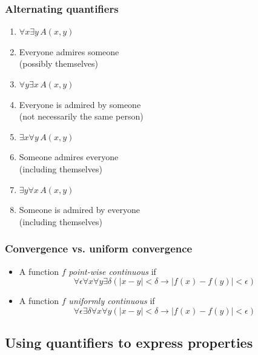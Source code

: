 \begin{frame}
    \frametitle{Alternating quantifiers}

\begin{enumerate}[<+->]
  \item $\forall x \exists y \, A(x, y)$
  \item<2->[] Everyone admires someone\\
    (possibly themselves)
  \item $\forall y \exists x \, A(x, y)$
  \item<3->[] Everyone is admired by someone\\
  (not necessarily the same person)
  \item $\exists x \forall y \, A(x, y)$
  \item<4->[] Someone admires everyone\\
  (including themselves)
  \item $\exists y \forall x \, A(x, y)$
  \item<5->[] Someone is admired by everyone\\
    (including themselves)
\end{enumerate}

\end{frame}

\begin{frame}
    \frametitle{Convergence vs. uniform convergence}

\begin{itemize}[<+->]
\item A function $f$ \emph{point-wise continuous} if
\[
\forall \epsilon\forall x\forall y\exists \delta(\left|x - y\right| < \delta \to \left|f(x) - f(y)\right| < \epsilon)
\]
\item A function $f$ \emph{uniformly continuous} if
\[
\forall \epsilon\exists \delta\forall x\forall y(\left|x - y\right| < \delta \to \left|f(x) - f(y)\right| < \epsilon)
\]
\end{itemize}

\end{frame}

\subsection{Using quantifiers to express properties}

